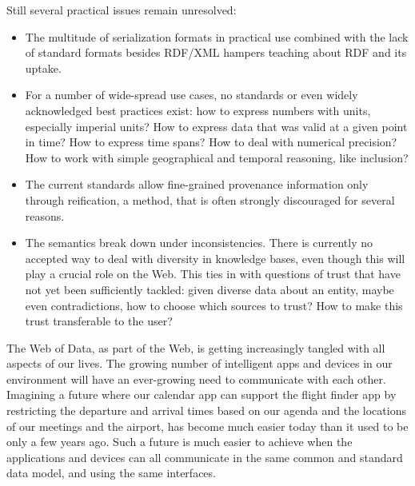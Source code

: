 Still several practical issues remain unresolved:
\begin{itemize}
\item The multitude of serialization formats in practical use combined with the lack of standard formats besides RDF/XML hampers teaching about RDF and its uptake.
\item For a number of wide-spread use cases, no standards or even widely acknowledged best practices exist: how to express numbers with units, especially imperial units? How to express data that was valid at a given point in time? How to express time spans? How to deal with numerical precision? How to work with simple geographical and temporal reasoning, like inclusion?
\item The current standards allow fine-grained provenance information only through reification, a method, that is often strongly discouraged for several reasons.
\item The semantics break down under inconsistencies. There is currently no accepted way to deal with diversity in knowledge bases, even though this will play a crucial role on the Web. This ties in with questions of trust that have not yet been sufficiently tackled: given diverse data about an entity, maybe even contradictions, how to choose which sources to trust? How to make this trust transferable to the user?
\end{itemize}

The Web of Data, as part of the Web, is getting increasingly tangled with all aspects of our lives.
The growing number of intelligent apps and devices in our environment will have an ever-growing need to communicate with each other.
Imagining a future where our calendar app can support the flight finder app by restricting the departure and arrival times based on our agenda and the locations of our meetings and the airport, has become much easier today than it used to be only a few years ago.
Such a future is much easier to achieve when the applications and devices can all communicate in the same common and standard data model, and using the same interfaces.

